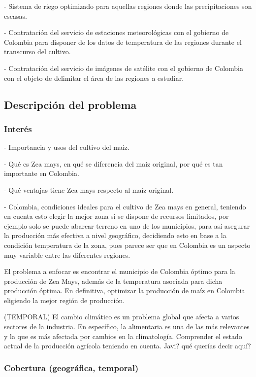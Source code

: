 \documentclass[12pt, spanish]{article}
\begin{document}
- Sistema de riego optimizado para aquellas regiones donde las precipitaciones son escasas.

- Contratación del servicio de estaciones meteorológicas con el gobierno de Colombia para disponer de los datos de temperatura de las regiones durante el transcurso del cultivo. 

- Contratación del servicio de imágenes de satélite con el gobierno de Colombia con el objeto de delimitar el área de las regiones a estudiar. 

\subsection{Descripción del problema}

\subsubsection{Interés}

- Importancia y usos del cultivo del maiz.

- Qué es Zea mays, en qué se diferencia del maiz original, por qué es tan importante en Colombia.

- Qué ventajas tiene Zea mays respecto al maíz original. 

- Colombia, condiciones ideales para el cultivo de Zea mays en general, teniendo en cuenta esto elegir la mejor zona si se dispone de recursos limitados, por ejemplo solo se puede abarcar terreno en uno de los municipios, para así asegurar la producción más efectiva a nivel geográfico, decidiendo esto en base a la condición temperatura de la zona, pues parece ser que en Colombia es un aspecto muy variable entre las diferentes regiones.

El problema a enfocar es encontrar el municipio de Colombia óptimo para la producción de Zea Mays, además de la temperatura asociada para dicha producción óptima. En definitiva, optimizar la producción de maíz en Colombia eligiendo la mejor región de producción.
        
(TEMPORAL) 
El cambio climático es un problema global que afecta a varios sectores de la industria. En específico, la alimentaria es una de las más relevantes y la que es más afectada por cambios en la climatología. Comprender el estado actual de la producción agrícola teniendo en cuenta. Javi? qué querías decir aquí?

\subsubsection{Cobertura (geográfica, temporal)}
\end{document}
